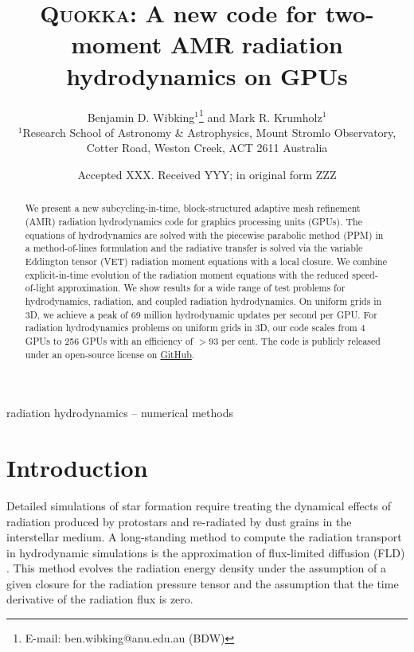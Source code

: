 \documentclass[fleqn,usenatbib]{mnras}
\title[Two-moment AMR radiation hydrodynamics on GPUs]{\textsc{Quokka}: A new code for two-moment AMR radiation hydrodynamics on GPUs}
\author[B. D. Wibking et al.]{
    Benjamin D. Wibking$^{1}$\thanks{E-mail: ben.wibking@anu.edu.au (BDW)}
    and Mark R. Krumholz$^{1}$
\\
$^{1}$Research School of Astronomy \& Astrophysics, Mount Stromlo Observatory, Cotter Road, Weston Creek, ACT 2611 Australia\\
}
\date{Accepted XXX. Received YYY; in original form ZZZ}
\begin{document}
\label{firstpage}
\pagerange{\pageref{firstpage}--\pageref{lastpage}}
\maketitle

\begin{abstract}
    We present a new subcycling-in-time, block-structured adaptive mesh refinement (AMR) radiation hydrodynamics code for graphics processing units (GPUs). The equations of hydrodynamics are solved with the piecewise parabolic method (PPM) in a method-of-lines formulation and the radiative transfer is solved via the variable Eddington tensor (VET) radiation moment equations with a local closure. We combine explicit-in-time evolution of the radiation moment equations with the reduced speed-of-light approximation. We show results for a wide range of test problems for hydrodynamics, radiation, and coupled radiation hydrodynamics. On uniform grids in 3D, we achieve a peak of $69$ million hydrodynamic updates per second per GPU. For radiation hydrodynamics problems on uniform grids in 3D, our code scales from 4 GPUs to 256 GPUs with an efficiency of $>93$ per cent. The code is publicly released under an open-source license on \faGithub\href{https://github.com/BenWibking/quokka-code}{GitHub}.
\end{abstract}

\begin{keywords}
radiation hydrodynamics -- numerical methods
\end{keywords}



\section{Introduction}
Detailed simulations of star formation require treating the dynamical effects of radiation produced by protostars and re-radiated by dust grains in the interstellar medium. A long-standing method to compute the radiation transport in hydrodynamic simulations is the approximation of flux-limited diffusion (FLD) \citep{Alme_1973}. This method evolves the radiation energy density under the assumption of a given closure for the radiation pressure tensor and the assumption that the time derivative of the radiation flux is zero.
\end{document}
